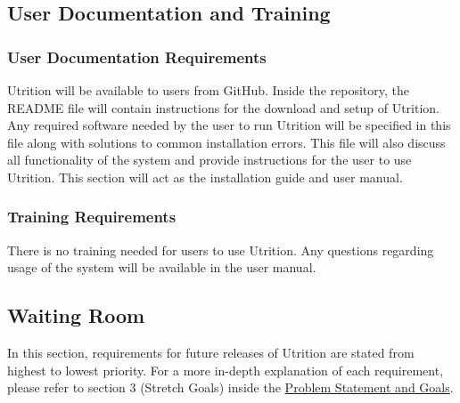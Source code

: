 \documentclass[12pt]{article}
\begin{document}
\subsection{User Documentation and Training}
\subsubsection{User Documentation Requirements}
Utrition will be available to users from GitHub. Inside the repository, the README file will contain instructions for the download and setup of Utrition. Any required software needed by the user to run Utrition will be specified in this file along with solutions to common installation errors. This file will also discuss all functionality of the system and provide instructions for the user to use Utrition. This section will act as the installation guide and user manual. 

\subsubsection{Training Requirements}
There is no training needed for users to use Utrition. Any questions regarding usage of the system will be available in the user manual.

\subsection{Waiting Room}
In this section, requirements for future releases of Utrition are stated from highest to lowest priority. For a more in-depth explanation of each requirement, please refer to section 3 (Stretch Goals) inside the \href{https://github.com/jeff-rey-wang/utrition/blob/main/docs/ProblemStatementAndGoals/ProblemStatement.pdf}{Problem Statement and Goals}.
\end{document}
